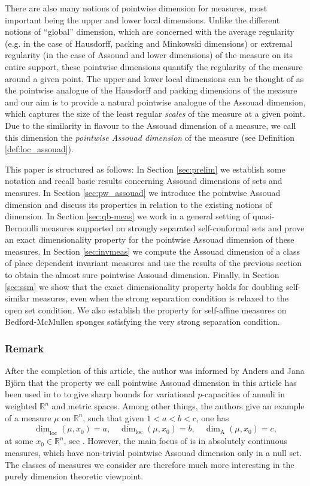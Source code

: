 \documentclass{PRM}
\newcommand{\field}[1]{\mathbb{#1}}
\newcommand{\R}{\field{R}}
\newcommand{\updim}{\overline{\dim}}
\newcommand{\lowdim}{\underline{\dim}}
\newcommand{\adim}{\dim_{\mathrm{A}}}
\theoremstyle{plain}
\theoremstyle{definition}
\theoremstyle{remark}
\begin{document}
There are also many notions of pointwise dimension for measures, most important being the upper and lower local dimensions. Unlike the different notions of ``global'' dimension, which are concerned with the average regularity (e.g. in the case of Hausdorff, packing and Minkowski dimensions) or extremal regularity (in the case of Assouad and lower dimensions) of the measure on its entire support, these pointwise dimensions quantify the regularity of the measure around a given point. The upper and lower local dimensions can be thought of as the pointwise analogue of the Hausdorff and packing dimensions of the measure and our aim is to provide a natural pointwise analogue of the Assouad dimension, which captures the size of the least regular \emph{scales} of the measure at a given point. Due to the similarity in flavour to the Assouad dimension of a measure, we call this dimension the \emph{pointwise Assouad dimension} of the measure (see Definition \ref{def:loc_assouad}).

This paper is structured as follows: In Section \ref{sec:prelim} we establish some notation and recall basic results concerning Assouad dimensions of sets and measures. In Section \ref{sec:pw_assouad} we introduce the pointwise Assouad dimension and discuss its properties in relation to the existing notions of dimension. In Section \ref{sec:qb-meas} we work in a general setting of quasi-Bernoulli measures supported on strongly separated self-conformal sets and prove an exact dimensionality property for the pointwise Assouad dimension of these measures. In Section \ref{sec:invmeas} we compute the Assouad dimension of a class of place dependent invariant measures and use the results of the previous section to obtain the almost sure pointwise Assouad dimension. Finally, in Section \ref{sec:ssm} we show that the exact dimensionality property holds for doubling self-similar measures, even when the strong separation condition is relaxed to the open set condition. We also establish the property for self-affine measures on Bedford-McMullen sponges satisfying the very strong separation condition.

\subsubsection*{Remark}
After the completion of this article, the author was informed by Anders and Jana Björn that the property we call pointwise Assouad dimension in this article has been used in \cite{BBL} to to give sharp bounds for variational $p$-capacities of annuli in weighted $\R^n$ and metric spaces. Among other things, the authors give an example of a measure $\mu$ on $\R^n$, such that given $1<a<b<c$, one has
\begin{equation*}
    \lowdim_{\mathrm{loc}}(\mu,x_0)=a,\quad \updim_{\mathrm{loc}}(\mu,x_0)=b,\quad\adim(\mu,x_0)=c,
\end{equation*}
at some $x_0\in\R^n$, see \cite[Example 3.4]{BBL}. However, the main focus of \cite{BBL} is in absolutely continuous measures, which have non-trivial pointwise Assouad dimension only in a null set. The classes of measures we consider are therefore much more interesting in the purely dimension theoretic viewpoint.
\end{document}
